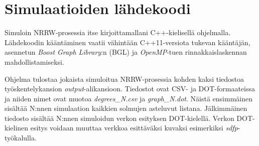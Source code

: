 \documentclass[finnish, 12pt, a4paper, sci, utf8, pdfa]{aaltothesis}
\begin{document}
\clearpage

\thesisappendix

\section{Simulaatioiden lähdekoodi\label{LiiteA}}

Simuloin NRRW-prosessia itse kirjoittamallani C++-kielisellä ohjelmalla. Lähdekoodin kääntäminen vaatii vähintään C++11-versiota tukevan kääntäjän, asennetun \textit{Boost Graph Library}:n (BGL) ja \textit{OpenMP}-tuen rinnakkaislaskennan mahdollistamiseksi.

Ohjelma tulostaa jokaista simuloitua NRRW-prosessia kohden kaksi tiedostoa työskentelykansion \textit{output}-alikansioon. Tiedostot ovat CSV- ja DOT-formaateissa ja niiden nimet ovat muotoa \textit{degrees\_N.csv} ja \textit{graph\_N.dot}. Näistä ensimmäinen sisältää N:nnen simulaation kaikkien solmujen asteluvut listana. Jälkimmäinen tiedosto sisältää N:nnen simuloidun verkon esityksen DOT-kielellä. Verkon DOT-kielinen esitys voidaan muuttaa verkkoa esittäväksi kuvaksi esimerkiksi \textit{sdfp}-työkalulla.

\vspace{0.5cm}


\end{document}
